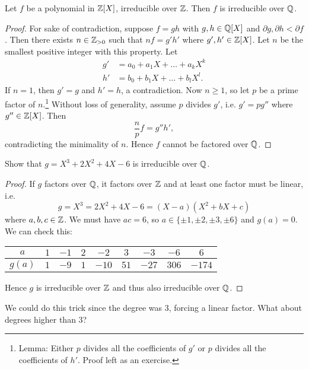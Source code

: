 \begin{theorem}
  Let $f$ be a polynomial in $\mathbb{Z}[X]$, irreducible
  over $\mathbb{Z}$. Then $f$ is irreducible over $\mathbb{Q}$.
\end{theorem}

\begin{proof}
  For sake of contradiction, suppose $f = gh$ with
  $g, h \in \mathbb{Q}[X]$ and $\partial g, \partial h < \partial f$.
  Then there exists $n \in \mathbb{Z}_{> 0}$ such that
  $nf = g' h'$ where $g', h' \in \mathbb{Z}[X]$. Let $n$ be the
  smallest positive integer with this property. Let
  \begin{align*}
    g' &= a_0 + a_1 X + \dots + a_k X^k \\
    h' &= b_0 + b_1 X + \dots + b_l X^l.
  \end{align*}
  If $n = 1$, then $g' = g$ and $h' = h$, a contradiction.
  Now $n \ge 1$, so let $p$ be a prime factor of $n$.\footnote{Lemma: Either $p$ divides all the coefficients of $g'$ or $p$ divides all the coefficients of $h'$. Proof left as an exercise.}
  Without loss of generality, assume $p$ divides $g'$,
  i.e. $g' = p g''$ where $g'' \in \mathbb{Z}[X]$. Then
  \[\frac{n}{p} f = g'' h',\]
  contradicting the minimality of $n$. Hence $f$
  cannot be factored over $\mathbb{Q}$.
\end{proof}

\begin{example}
  Show that $g = X^3 + 2X^2 + 4X - 6$ is irreducible
  over $\mathbb{Q}$.
\end{example}

\begin{proof}
  If $g$ factors over $\mathbb{Q}$, it factors over $\mathbb{Z}$ and
  at least one factor must be linear, i.e.
  \[g = X^3 = 2X^2 + 4X - 6 = (X - a)(X^2 + bX + c)\]
  where $a, b, c \in \mathbb{Z}$. We must have $ac = 6$, so
  $a \in \{\pm 1, \pm 2, \pm 3, \pm 6\}$ and $g(a) = 0$.
  We can check this:
  \begin{center}
    \begin{tabular}{c|cccccccc}
      $a$ & $1$ & $-1$ & $2$ & $-2$ & $3$ & $-3$ & $-6$ & $6$ \\
      \hline
      $g(a)$ & $1$ & $-9$ & $1$ & $-10$ & $51$ & $-27$ & $306$ & $-174$
    \end{tabular}
  \end{center}
  Hence $g$ is irreducible over $\mathbb{Z}$ and thus also
  irreducible over $\mathbb{Q}$.
\end{proof}

We could do this trick since the degree was 3,
forcing a linear factor.
What about degrees higher than 3?

